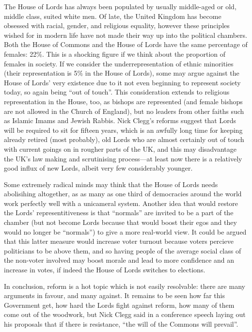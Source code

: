 \documentclass[a4paper]{article}
\begin{document}
The House of Lords has always been populated by usually middle-aged or old, middle class, suited white men.  Of late, the United Kingdom has become obsessed with racial, gender, and religious equality, however these principles wished for in modern life have not made their way up into the political chambers.  Both the House of Commons and the House of Lords have the same percentage of females: 22\%.  This is a shocking figure if we think about the proportion of females in society.  If we consider the underrepresentation of ethnic minorities (their representation is 5\% in the House of Lords), some may argue against the House of Lords' very existence due to it not even beginning to represent society today, so again being ``out of touch''.  This consideration extends to religious representation in the House, too, as bishops are represented (and female bishops are not allowed in the Church of England), but no leaders from other faiths such as Islamic Imams and Jewish Rabbis.  Nick Clegg's reforms suggest that Lords will be required to sit for fifteen years, which is an awfully long time for keeping already retired (most probably), old Lords who are almost certainly out of touch with current goings on in rougher parts of the UK, and this may disadvantage the UK's law making and scrutinising process---at least now there is a relatively good influx of new Lords, albeit very few considerably younger.

Some extremely radical minds may think that the House of Lords needs abolisihing altogether, as as many as one third of democracies around the world work perfectly well with a unicameral system.  Another idea that would restore the Lords' representitiveness is that ``normals'' are invited to be a part of the chamber (but not become Lords because that would boost their egos and they would no longer be ``normals'') to give a more real-world view.  It could be argued that this latter measure would increase voter turnout because voters percieve politicians to be above them, and so having people of the average social class of the non-voter involved may boost morale and lead to more confidence and an increase in votes, if indeed the House of Lords switches to elections.

In conclusion, reform is a hot topic which is not easily resolvable: there are many arguments in favour, and many against.  It remains to be seen how far this Government get, how hard the Lords fight against reform, how many of them come out of the woodwork, but Nick Clegg said in a conference speech laying out his proposals that if there is resistance, ``the will of the Commons will prevail''.
\end{document}
